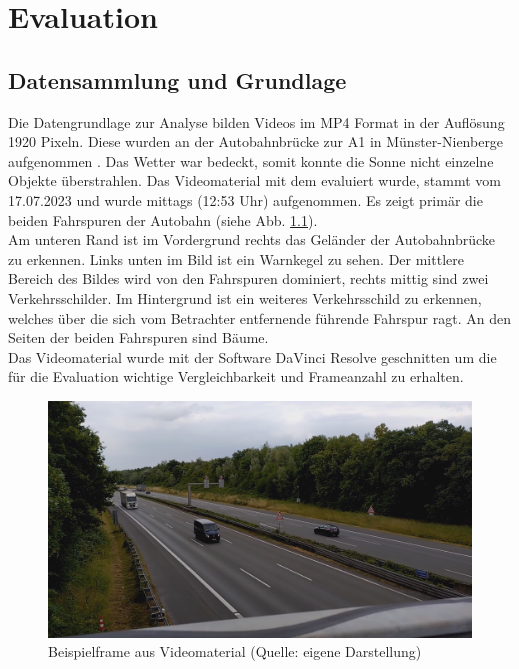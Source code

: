 \chapter{Evaluation}
\label{ch:Evaluation}
\section{Datensammlung und Grundlage}
{ \label{sec:datengrundlage}
	Die Datengrundlage zur Analyse bilden Videos im MP4 Format in der Auflösung 1920  Pixeln. Diese wurden an der Autobahnbrücke zur A1 in Münster-Nienberge aufgenommen \citep{GMaps}. Das Wetter war bedeckt, somit konnte die Sonne nicht einzelne Objekte überstrahlen. Das Videomaterial mit dem evaluiert wurde, stammt vom 17.07.2023 und wurde mittags (12:53 Uhr) aufgenommen. Es zeigt primär die beiden Fahrspuren der Autobahn (siehe Abb. \ref{Bsp_Evaluations_Vidmat}). \\
	Am unteren Rand ist im Vordergrund rechts das Geländer der Autobahnbrücke zu erkennen. Links unten im Bild ist ein Warnkegel zu sehen. Der mittlere Bereich des Bildes wird von den Fahrspuren dominiert, rechts mittig sind zwei Verkehrsschilder. Im Hintergrund ist ein weiteres Verkehrsschild zu erkennen, welches über die sich vom Betrachter entfernende führende Fahrspur ragt. An den Seiten der beiden Fahrspuren sind Bäume. \\
	Das Videomaterial wurde mit der Software DaVinci Resolve \citep{davinciresolve} geschnitten um die für die Evaluation wichtige Vergleichbarkeit und Frameanzahl zu erhalten.
	\begin{figure}[ht]
		\centering
		\includegraphics*[scale = 0.35, keepaspectratio ]{images/Evaluation/Screenshot_Video_A10s.png}
		\caption[Beispielframe aus Videomaterial]{Beispielframe aus Videomaterial (Quelle: eigene Darstellung)} 
		\label{Bsp_Evaluations_Vidmat}
 \end{figure}
}


